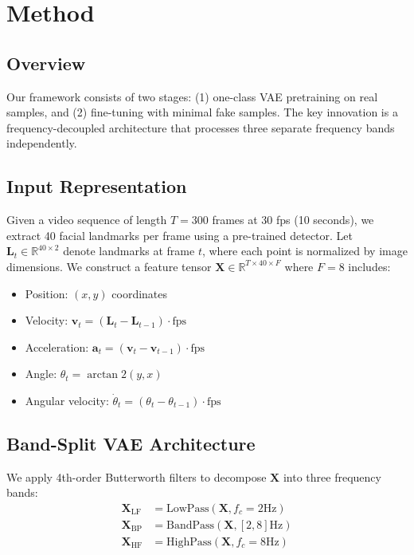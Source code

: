 \documentclass{article}
\begin{document}
\section{Method}
\label{sec:method}

\subsection{Overview}

Our framework consists of two stages: (1) one-class VAE pretraining on real samples, and (2) fine-tuning with minimal fake samples. The key innovation is a frequency-decoupled architecture that processes three separate frequency bands independently.

\subsection{Input Representation}

Given a video sequence of length $T=300$ frames at 30 fps (10 seconds), we extract 40 facial landmarks per frame using a pre-trained detector. Let $\mathbf{L}_t \in \mathbb{R}^{40 \times 2}$ denote landmarks at frame $t$, where each point is normalized by image dimensions. We construct a feature tensor $\mathbf{X} \in \mathbb{R}^{T \times 40 \times F}$ where $F=8$ includes:
\begin{itemize}
    \item Position: $(x, y)$ coordinates
    \item Velocity: $\mathbf{v}_t = (\mathbf{L}_t - \mathbf{L}_{t-1}) \cdot \text{fps}$
    \item Acceleration: $\mathbf{a}_t = (\mathbf{v}_t - \mathbf{v}_{t-1}) \cdot \text{fps}$
    \item Angle: $\theta_t = \arctan2(y, x)$
    \item Angular velocity: $\dot{\theta}_t = (\theta_t - \theta_{t-1}) \cdot \text{fps}$
\end{itemize}

\subsection{Band-Split VAE Architecture}

We apply 4th-order Butterworth filters to decompose $\mathbf{X}$ into three frequency bands:
\begin{align}
    \mathbf{X}_{\text{LF}} &= \text{LowPass}(\mathbf{X}, f_c=2\text{Hz}) \\
    \mathbf{X}_{\text{BP}} &= \text{BandPass}(\mathbf{X}, [2, 8]\text{Hz}) \\
    \mathbf{X}_{\text{HF}} &= \text{HighPass}(\mathbf{X}, f_c=8\text{Hz})
\end{align}
\end{document}
